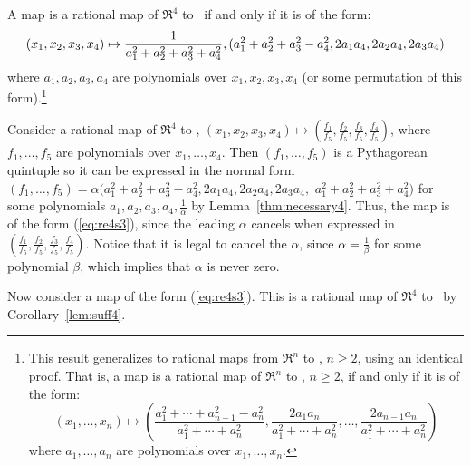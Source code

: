 \documentclass[11pt]{article}
\begin{document}
\begin{corollary}
\label{thm:map4}
A map is a rational map of $\Re^4$ to \ if and only if
it is of the form:
\begin{equation}
\label{eq:re4s3}
\small{(x_1,x_2,x_3,x_4)} \mapsto 
\small{\frac{1}{a_1^2 + a_2^2 + a_3^2 + a_4^2},
	(a_1^2 + a_2^2 + a_3^2 - a_4^2, 2a_1a_4, 2a_2a_4, 2a_3a_4)}
\end{equation}
where $a_1,a_2,a_3,a_4$ are polynomials over $x_1,x_2,x_3,x_4$
(or some permutation of this form).\footnote{This result generalizes
	to rational maps from $\Re^n$ to , $n \geq 2$,
	using an identical proof.
	That is, a map is a rational map of $\Re^n$ to , $n \geq 2$, 
	if and only if it is of the form:
\[
	(x_1,\ldots,x_n) \mapsto
	(\frac{a_1^2 + \cdots + a_{n-1}^2 - a_n^2}{a_1^2 + \cdots + a_n^2},
	 \frac{2a_1a_n}{a_1^2 + \cdots + a_n^2},
	 \ldots,
	 \frac{2a_{n-1}a_n}{a_1^2 + \cdots + a_n^2})
\]
where $a_1,\ldots,a_n$ are polynomials over $x_1,\ldots,x_n$.}
\end{corollary}
\prf
Consider a rational map
of $\Re^4$ to , $(x_1,x_2,x_3,x_4) \mapsto 
(\frac{f_1}{f_5},\frac{f_2}{f_5},\frac{f_3}{f_5},\frac{f_4}{f_5})$,
where $f_1,\ldots,f_5$ are polynomials over $x_1,\ldots,x_4$.
Then $(f_1,\ldots,f_5)$ is a Pythagorean quintuple
so it can be expressed in the normal form
$(f_1,\ldots,f_5) = \alpha (a_1^2 + a_2^2 + a_3^2 - a_4^2,
2a_1a_4,2a_2a_4,2a_3a_4,$ $a_1^2 + a_2^2 + a_3^2 + a_4^2)$
for some polynomials $a_1,a_2,a_3,a_4,\frac{1}{\alpha}$
by Lemma~\ref{thm:necessary4}.
Thus, the map is of the form (\ref{eq:re4s3}), since the leading $\alpha$
cancels when expressed in 
$(\frac{f_1}{f_5},\frac{f_2}{f_5},\frac{f_3}{f_5},\frac{f_4}{f_5})$.
Notice that it is legal to cancel the $\alpha$, since
$\alpha = \frac{1}{\beta}$ for some polynomial $\beta$,
which implies that $\alpha$ is never zero.

Now consider a map of the form (\ref{eq:re4s3}).
This is a rational map of $\Re^4$ to \ by Corollary~\ref{lem:suff4}.
\QED
\end{document}
